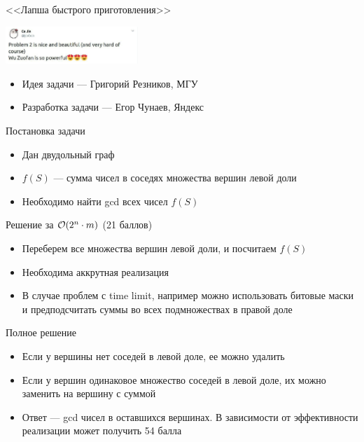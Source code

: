 \begin{frame}
  \begin{center}
    \LARGE <<Лапша быстрого приготовления>>
  \end{center}

  \begin{center}
      \includegraphics[width=5cm]{memes/f-meme.jpg}
  \end{center}

  \begin{itemize}
  \item Идея задачи --- Григорий Резников, МГУ
  \item Разработка задачи --- Егор Чунаев, Яндекс
  \end{itemize}

\end{frame}

\begin{frame}{Постановка задачи}

  \begin{itemize}
  \item Дан двудольный граф
  \item $f(S)$ --- сумма чисел в соседях множества вершин левой доли
  \item Необходимо найти gcd всех чисел $f(S)$
  \end{itemize}
  
\end{frame}

\begin{frame}{Решение за $\mathcal{O}(2^n\cdot m)$ (21 баллов)}
  \begin{itemize}
  \item Переберем все множества вершин левой доли, и посчитаем $f(S)$
  \item Необходима аккрутная реализация
  \item В случае проблем с time limit, например можно использовать битовые маски
        и предподсчитать суммы во всех подмножествах в правой доле
  \end{itemize}
\end{frame}

\begin{frame}{Полное решение}
  \begin{itemize}
  \item Если у вершины нет соседей в левой доле, ее можно удалить
  \item Если у вершин одинаковое множество соседей в левой доле, их можно заменить на вершину с суммой
  \item Ответ --- gcd чисел в оставшихся вершинах. В зависимости от эффективности реализации может получить 54 балла
  \end{itemize}
\end{frame}

